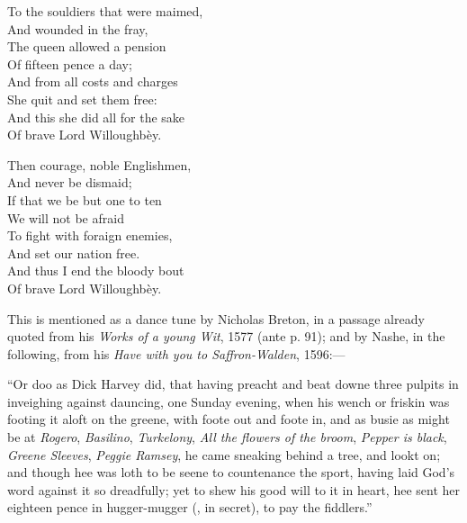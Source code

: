 \begin{dcverse}
\begin{altverse}
To the souldiers that were maimed,\\
And wounded in the fray,\\
The queen allowed a pension\\
Of fifteen pence a day;\\
And from all costs and charges\\
She quit and set them free:\\
And this she did all for the sake\\
Of brave Lord Willoughbèy.
\end{altverse}

\begin{altverse}
Then courage, noble Englishmen,\\
And never be dismaid;\\
If that we be but one to ten\\
We will not be afraid\\
To fight with foraign enemies,\\
And set our nation free.\\
And thus I end the bloody bout\\
Of brave Lord Willoughbèy.
\end{altverse}
\end{dcverse}


This is mentioned as a dance tune by Nicholas Breton, in a passage already
quoted from his \textit{Works of a young Wit}, 1577 (ante p. 91); and by Nashe, in the
following, from his \textit{Have with you to Saffron-Walden}, 1596:—

“Or doo as Dick Harvey did, that having preacht and beat downe three pulpits in
inveighing against dauncing, one Sunday evening, when his wench or friskin was footing
it aloft on the greene, with foote out and foote in, and as busie as might be at
\textit{Rogero}, \textit{Basilino}, \textit{Turkelony}, \textit{All the flowers of the broom}, \textit{Pepper is black}, \textit{Greene
Sleeves}, \textit{Peggie Ramsey},
 he came sneaking behind a tree, and lookt on; and though
hee was loth to be seene to countenance the sport, having laid God’s word against it so
dreadfully; yet to shew his good will to it in heart, hee sent her eighteen pence in
hugger-mugger (\ie, in secret), to pay the fiddlers.”

